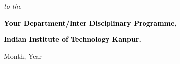\begin{titlepage}
\begin{center}
    
    {\large \textit{to the}\par}
    \vspace{0.1cm}
    {\large \textbf{{\textcolor{black}{Your Department/Inter Disciplinary Programme,}}}} %

    {\large \textbf{{\textcolor{black}{Indian Institute of Technology Kanpur.}}}}
    \vspace{0.4cm}
    
    {\large {Month, Year}}
\end{center}
\end{titlepage}